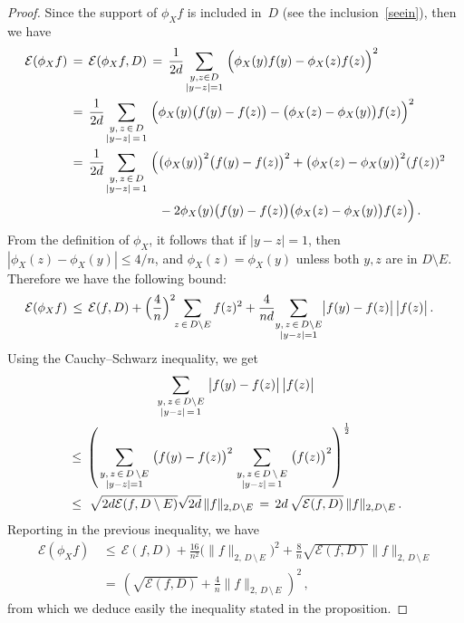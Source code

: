 \documentclass[AHL, Unicode, longabstracts, published]{cedram}
\newcommand{\tatop}[2]{\genfrac{}{}{0pt}{1}{#1}{#2}}
\newcommand{\cE}{\mathcal{E}}
\begin{document}
\begin{proof}
Since the support of $\phi_Xf$ is included in~$D$ (see the inclusion~\eqref{seein}), then we have
\begin{align*}
\cE(\phi_Xf)\,&=\,
\cE(\phi_Xf,D)
\,=\,
\frac{1}{2d}
\!
\sum_{\tatop{y,z\in D}{|y-z|=1}}
\Big(\phi_X(y)f(y)-\phi_X(z)f(z)\Big)^2\\
\,&=\,
\frac{1}{2d}
\!
\sum_{\tatop{y,\,z\,\in\,D}{|y-z|\,=\,1}}
\Big(\phi_X(y)\big(f(y)-f(z)\big)-\big(\phi_X(z)-\phi_X(y)\big)f(z)\Big)^2\\
\,&=\,
\frac{1}{2d}
\!
\sum_{\tatop{y,\,z\,\in\,D}{|y-z|\,=\,1}}
\Big(
\big(\phi_X(y)\big)^2\big(f(y)-f(z)\big)^2+
\big(\phi_X(z)-\phi_X(y)\big)^2(f(z))^2\\ &\kern70pt -2
\phi_X(y)\big(f(y)-f(z)\big)\big(\phi_X(z)-\phi_X(y)\big)f(z)\Big)\,.
\end{align*}
From the definition of $\phi_X$, it follows that if $|y-z|=1$, then $|\phi_X(z)-\phi_X(y)|\leq 4/n$, and $\phi_X(z)=\phi_X(y)$ unless both $y,z$ are in $D\setminus E$. Therefore we have the following bound:
\begin{align*}
\cE(\phi_Xf)
\,&\leq\,\cE(f,D)+\Big(\frac{4}{n}\Big)^2
\kern -3pt
\sum_{z\,\in\,D\setminus E} f(z)^2 +\frac{4}{nd}\kern -3pt
\sum_{\tatop{y,\,z\,\in\,D\setminus E}{|y-z|=1}}
\kern -3pt
\big| f(y)-f(z)\big|\,\big|f(z)\big|\,.
\end{align*}
Using the Cauchy--Schwarz inequality, we get
\begin{multline*}
\sum_{\tatop{y,\,z\,\in\,D\setminus E}{|y-z|\,=\,1}}
\big| f(y)-f(z)\big|\,\big|f(z)\big|\\
\begin{aligned}
&\leq\,\left(\sum_{\tatop{y,\,z\,\in\,D\,\setminus E}{|y-z|=1}}
\big(f(y)-f(z)\big)^2
\sum_{\tatop{y,\,z\,\in\,D\,\setminus\,E}{|y-z|\,=\,1}}
\big(f(z)\big)^2\right)^{\frac{1}{2}}\\
&\leq\,\,\sqrt{2d \cE(f,D\setminus E)}
\sqrt{2d}\, \|f\|_{2,D\setminus E}
\,=\,{2d}\,\sqrt{\cE(f,D)}\, \|f\|_{2,D\setminus E}\,.
\end{aligned}
\end{multline*}
Reporting in the previous inequality, we have
\begin{align*}
\cE(\phi_Xf)
\,&\leq\,\cE(f,D)+
\frac{16}{n^2}
\big(\|f\|_{2,\,D\,\setminus\,E}\big)^2 +\frac{8}{n}
\sqrt{\cE(f,D)} \|f\|_{2,\,D\,\setminus\,E}\\
\,&=\,
\left(
\sqrt{\cE(f,D)}+
\frac{4}{n} \|f\|_{2,\,D\,\setminus\,E}\right)^2\,,
\end{align*}
from which we deduce easily the inequality stated in the proposition.
\end{proof}
\end{document}
